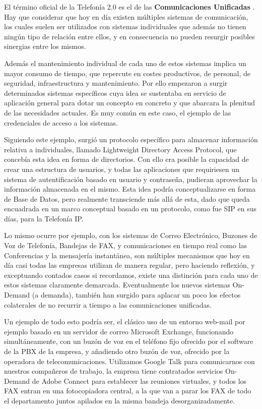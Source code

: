 El término oficial de la Telefonía 2.0 es el de las \textbf{Comunicaciones Unificadas} \cite{website:comuni}. Hay que considerar que hoy en día existen múltiples sistemas de comunicación, los cuales suelen ser utilizados con sistemas individuales que además no tienen ningún tipo de relación entre ellos, y en consecuencia no pueden resurgir posibles sinergias entre los mismos.

Además el mantenimiento individual de cada uno de estos sistemas implica un mayor consumo de tiempo, que repercute en costes productivos, de personal, de seguridad, infraestructura y mantenimiento. Por ello empezaron a surgir determinados sistemas específicos cuya idea se sustentaba en servicio de aplicación general para dotar un concepto en concreto y que abarcara la plenitud de las necesidades actuales. Es muy común en este caso, el ejemplo de las credenciales de acceso a los sistemas.

Siguiendo este ejemplo, surgió un protocolo específico para almacenar información relativa a individuales, llamado Lightweight Directory Access Protocol, que concebía esta idea en forma de directorios. Con ello era posible la capacidad de crear una estructura de usuarios, y todas las aplicaciones que requiriesen un sistema de autentificación basado en usuario y contraseña, pudieran aprovechar la información almacenada en el mismo. Esta idea podría conceptualizarse en forma de Base de Datos, pero realmente transciende más allá de esta, dado que queda encuadrada en un marco conceptual basado en un protocolo, como fue SIP en sus días, para la Telefonía IP. 

Lo mismo ocurre por ejemplo, con los sistemas de Correo Electrónico, Buzones de Voz de Telefonía, Bandejas de FAX, y comunicaciones en tiempo real como las Conferencias y la mensajería instantánea, son múltiples mecanismos que hoy en día casi todas las empresas utilizan de manera regular, pero haciendo reflexión, y exceptuando contados casos si recordamos, existe una distinción para cada uno de estos sistemas claramente demarcada. Eventualmente los nuevos sistemas On-Demand (a demanda), también han surgido para aplacar un poco los efectos colaterales de no recurrir a tiempo a las comunicaciones unificadas. 

Un ejemplo de todo esto podría ser, el clásico uso de un entorno web-mail por ejemplo basado en un servidor de correo Microsoft Exchange, funcionando simultáneamente, con un buzón de voz en el teléfono fijo ofrecido por el software de la PBX de la empresa, y añadiendo otro buzón de voz, ofrecido por la operadora de telecomunicaciones. Utilizamos Google Talk para comunicarnos con nuestros compañeros de trabajo, la empresa tiene contratados servicios On-Demand de Adobe Connect para establecer las reuniones virtuales, y todos los FAX entran en una fotocopiadora central, a la que van a parar los FAX de todo el departamento juntos apilados en la misma bandeja desorganizadamente.

